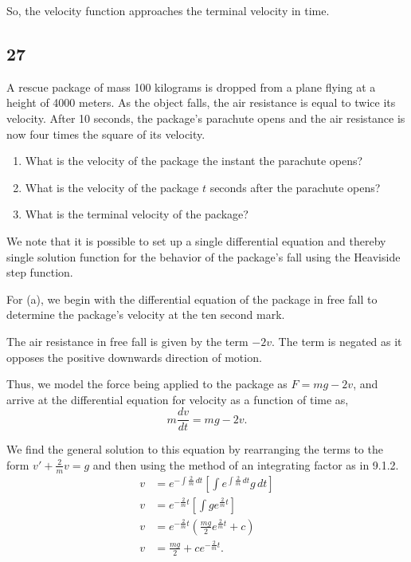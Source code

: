 \documentclass[../hw11]{subfiles}
\begin{document}
So, the velocity function approaches the terminal velocity in time.

\subsection*{27}

A rescue package of mass 100 kilograms is dropped from a plane flying at a height of 4000 meters. 
As the object falls, the air resistance is equal to twice its velocity. 
After 10 seconds, the package’s parachute opens and the air resistance is now four times the square of its velocity.

\begin{enumerate}[label= (\alph*)]
    \item What is the velocity of the package the instant the
    parachute opens?
    \item What is the velocity of the package $t$ seconds after the
    parachute opens?
    \item What is the terminal velocity of the package?
\end{enumerate}

We note that it is possible to set up a single differential equation and thereby single solution function for the behavior of the package's fall using the Heaviside step function.

For (a), we begin with the differential equation of the package in free fall to determine the package's velocity at the ten second mark.

The air resistance in free fall is given by the term $-2v$. The term is negated as it opposes the positive downwards direction of motion.

Thus, we model the force being applied to the package as $F=mg-2v$, and arrive at the differential equation for velocity as a function of time as,
\[m\frac{dv}{dt}=mg-2v.\]

We find the general solution to this equation by rearranging the terms to the form $v'+\frac{2}{m}v=g$ and then using the method of an integrating factor as in 9.1.2.
\begin{align*}
    v&=e^{-\int\frac{2}{m}\,dt}\left[ \int e^{\int\frac{2}{m}\,dt}g\,dt \right]\\
    v&=e^{-\frac{2}{m}t}\left[ \int g e^{\frac{2}{m}t} \right] \\
    v&=e^{-\frac{2}{m}t}\left( \frac{mg}{2} e^{\frac{2}{m}t} + c \right) \\
    v&=\frac{mg}{2}+ce^{-\frac{2}{m}t}. \\
\end{align*}
\end{document}
